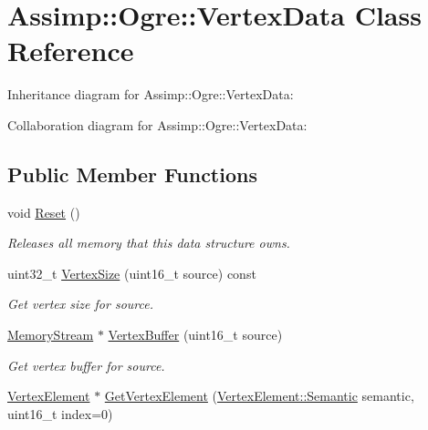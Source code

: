 \hypertarget{class_assimp_1_1_ogre_1_1_vertex_data}{\section{Assimp\+:\+:Ogre\+:\+:Vertex\+Data Class Reference}
\label{class_assimp_1_1_ogre_1_1_vertex_data}
}


Inheritance diagram for Assimp\+:\+:Ogre\+:\+:Vertex\+Data\+:


Collaboration diagram for Assimp\+:\+:Ogre\+:\+:Vertex\+Data\+:
\subsection*{Public Member Functions}
\begin{DoxyCompactItemize}
\item 
\hypertarget{class_assimp_1_1_ogre_1_1_vertex_data_aba2d570de655a007612c7eab52144062}{void \hyperlink{class_assimp_1_1_ogre_1_1_vertex_data_aba2d570de655a007612c7eab52144062}{Reset} ()}\label{class_assimp_1_1_ogre_1_1_vertex_data_aba2d570de655a007612c7eab52144062}

\begin{DoxyCompactList}\small\item\em Releases all memory that this data structure owns. \end{DoxyCompactList}\item 
\hypertarget{class_assimp_1_1_ogre_1_1_vertex_data_adcf2f6fbac3465af0f0221169d37b909}{uint32\+\_\+t \hyperlink{class_assimp_1_1_ogre_1_1_vertex_data_adcf2f6fbac3465af0f0221169d37b909}{Vertex\+Size} (uint16\+\_\+t source) const }\label{class_assimp_1_1_ogre_1_1_vertex_data_adcf2f6fbac3465af0f0221169d37b909}

\begin{DoxyCompactList}\small\item\em Get vertex size for {\ttfamily source}. \end{DoxyCompactList}\item 
\hypertarget{class_assimp_1_1_ogre_1_1_vertex_data_a6298ef396d0bde38354c4562f1e93e21}{\hyperlink{class_assimp_1_1_memory_i_o_stream}{Memory\+Stream} $\ast$ \hyperlink{class_assimp_1_1_ogre_1_1_vertex_data_a6298ef396d0bde38354c4562f1e93e21}{Vertex\+Buffer} (uint16\+\_\+t source)}\label{class_assimp_1_1_ogre_1_1_vertex_data_a6298ef396d0bde38354c4562f1e93e21}

\begin{DoxyCompactList}\small\item\em Get vertex buffer for {\ttfamily source}. \end{DoxyCompactList}\item 
\hypertarget{class_assimp_1_1_ogre_1_1_vertex_data_a5d7cb0d9f6c145340f25746e9e63e030}{\hyperlink{class_assimp_1_1_ogre_1_1_vertex_element}{Vertex\+Element} $\ast$ \hyperlink{class_assimp_1_1_ogre_1_1_vertex_data_a5d7cb0d9f6c145340f25746e9e63e030}{Get\+Vertex\+Element} (\hyperlink{class_assimp_1_1_ogre_1_1_vertex_element_a34497be6620a9ecece6ff193a044d6bb}{Vertex\+Element\+::\+Semantic} semantic, uint16\+\_\+t index=0)}\label{class_assimp_1_1_ogre_1_1_vertex_data_a5d7cb0d9f6c145340f25746e9e63e030}


\end{DoxyCompactItemize}
